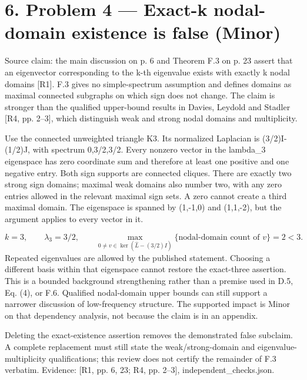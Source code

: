 \documentclass[10pt]{article}
\begin{document}
\section*{6. Problem 4 — Exact-k nodal-domain existence is false (Minor)}
Source claim: the main discussion on p. 6 and Theorem F.3 on p. 23 assert that an eigenvector corresponding to the k-th eigenvalue exists with exactly k nodal domains [R1]. F.3 gives no simple-spectrum assumption and defines domains as maximal connected subgraphs on which sign does not change. The claim is stronger than the qualified upper-bound results in Davies, Leydold and Stadler [R4, pp. 2–3], which distinguish weak and strong nodal domains and multiplicity.\par
Use the connected unweighted triangle K3. Its normalized Laplacian is (3/2)I-(1/2)J, with spectrum 0,3/2,3/2. Every nonzero vector in the lambda\_3 eigenspace has zero coordinate sum and therefore at least one positive and one negative entry. Both sign supports are connected cliques. There are exactly two strong sign domains; maximal weak domains also number two, with any zero entries allowed in the relevant maximal sign sets. A zero cannot create a third maximal domain. The eigenspace is spanned by (1,-1,0) and (1,1,-2), but the argument applies to every vector in it.\par
\[k=3,\qquad \lambda_3=3/2,\qquad \max_{0\ne v\in\ker(\widehat L-(3/2)I)}\{\text{nodal-domain count of }v\}=2<3.\] Repeated eigenvalues are allowed by the published statement. Choosing a different basis within that eigenspace cannot restore the exact-three assertion. This is a bounded background strengthening rather than a premise used in D.5, Eq. (4), or F.6. Qualified nodal-domain upper bounds can still support a narrower discussion of low-frequency structure. The supported impact is Minor on that dependency analysis, not because the claim is in an appendix.\par
Deleting the exact-existence assertion removes the demonstrated false subclaim. A complete replacement must still state the weak/strong-domain and eigenvalue-multiplicity qualifications; this review does not certify the remainder of F.3 verbatim. Evidence: [R1, pp. 6, 23; R4, pp. 2–3], independent\_checks.json.\par
\end{document}

